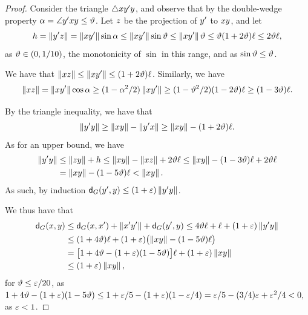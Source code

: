 \documentclass[12pt]{article}%
\begin{document}
\begin{proof}
    Consider the triangle $\triangle x y' y$, and observe that
    by the double-wedge property
    $\alpha = \angle y' x y \leq \vartheta$.  Let $z$ be the
    projection of $y'$ to $x y$, and let
    \begin{equation*}
        h%
        =%
        \dY{\py'}{ \pz}%
        =%
        \dY{\px}{\py'} \sin \alpha
        \leq
        \dY{\px}{\py'} \sin \epsA
        \leq%
        \dY{\px}{\py'}  \epsA
        \leq%
        \epsA (1+2 \epsA)\ell
        \leq
        2 \epsA \ell,
    \end{equation*}
    as $\vartheta \in (0,1/10)$, the monotonicity of $\sin$ in this range,
    and as $\sin \vartheta \leq \vartheta$.

    We have that
    $\left\| x z \right\| \leq \left\| x y' \right\| \leq
    (1+2\vartheta)\ell$. Similarly, we have
    \begin{equation*}
        \dY{\px}{\pz}%
        =%
        \dY{\px}{\py'} \cos \alpha
        \geq%
        (1-\alpha^2/2)\dY{\px}{\py'}
        \geq
        (1-\epsA^2/2)(1-2\epsA)\ell
        \geq
        (1-3\epsA)\ell.
    \end{equation*}


    By the triangle inequality, we have that
    \begin{equation*}
        \dY{\py'}{\py}
        \geq%
        \dY{\px}{\py}
        -\dY{\py'}{\px}
        \geq%
        \dY{\px}{\py}
        - (1+2\epsA)\ell.
    \end{equation*}
    As for an upper bound, we have
    \begin{align*}
      \dY{\py'}{\py}
      &\leq%
        \dY{\pz}{\py} + h%
        \leq%
        \dY{\px}{\py} - \dY{\px}{\pz} +
        2 \epsA \ell
        \leq
        \dY{\px}{\py} - (1-3\epsA)\ell
        +2 \epsA \ell
      \\&
      =
      \dY{\px}{\py} - (1-5\epsA)\ell
      <%
      \dY{\px}{\py}.
    \end{align*}
    As such, by induction
    $\dGZ{\G}{\py'}{\py} \leq (1+\eps) \dY{\py'}{\py}$.

    We thus have that
    \begin{align*}
      \dGZ{\G}{\px}{\py}%
      &\leq%
        \dGZ{\G}{\px}{\px'} + \dY{\px'}{\py'}
        +
        \dGZ{\G}{\py'}{\py}%
        \leq%
        4\epsA \ell
        +
        \ell
        +
        (1+\eps) \dY{\py'}{\py}
      \\&
      \leq%
      (1+4\epsA) \ell
      +
      (1+\eps) \pth{\bigl.
      \dY{\px}{\py} - (1-5\epsA)\ell }
      \\&
      =%
      \bigl[1+4\epsA
      - (1+\eps)(1-5\epsA)\bigr]\ell
      +
      (1+\eps)
      \dY{\px}{\py}%
      \\&
      \leq%
      (1+\eps)
      \dY{\px}{\py},
    \end{align*}
    for $\vartheta \leq \varepsilon/20$, as
    \begin{math}
        1+4\epsA - (1+\eps)(1-5\epsA)%
        \leq%
        1+\eps/5 - (1+\eps)(1-\eps/4)%
        =%
        \eps/5 -(3/4)\eps + \eps^2/4 < 0,
    \end{math}
    as $\varepsilon < 1$.
\end{proof}
\end{document}
